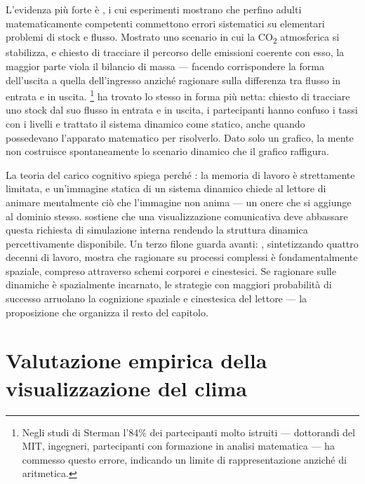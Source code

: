 L'evidenza più forte è \citet{sterman2008}, i cui esperimenti mostrano che perfino adulti matematicamente competenti commettono errori sistematici su elementari problemi di stock e flusso. Mostrato uno scenario in cui la CO\textsubscript{2} atmosferica si stabilizza, e chiesto di tracciare il percorso delle emissioni coerente con esso, la maggior parte viola il bilancio di massa --- facendo corrispondere la forma dell'uscita a quella dell'ingresso anziché ragionare sulla differenza tra flusso in entrata e in uscita.
\footnote{Negli studi di Sterman l'84\% dei partecipanti molto istruiti --- dottorandi del MIT, ingegneri, partecipanti con formazione in analisi matematica --- ha commesso questo errore, indicando un limite di rappresentazione anziché di aritmetica.} \citet{cronin2009} ha trovato lo stesso in forma più netta: chiesto di tracciare uno stock dal suo flusso in entrata e in uscita, i partecipanti hanno confuso i tassi con i livelli e trattato il sistema dinamico come statico, anche quando possedevano l'apparato matematico per risolverlo. Dato solo un grafico, la mente non costruisce spontaneamente lo scenario dinamico che il grafico raffigura.



La teoria del carico cognitivo spiega perché \citep{sweller1988, swellervanmerrienboer2019}: la memoria di lavoro è strettamente limitata, e un'immagine statica di un sistema dinamico chiede al lettore di animare mentalmente ciò che l'immagine non anima --- un onere che si aggiunge al dominio stesso. \citet{ware2021} sostiene che una visualizzazione comunicativa deve abbassare questa richiesta di simulazione interna rendendo la struttura dinamica percettivamente disponibile. Un terzo filone guarda avanti: \citet{tversky2019}, sintetizzando quattro decenni di lavoro, mostra che ragionare su processi complessi è fondamentalmente spaziale, compreso attraverso schemi corporei e cinestesici. Se ragionare sulle dinamiche è spazialmente incarnato, le strategie con maggiori probabilità di successo arruolano la cognizione spaziale e cinestesica del lettore --- la proposizione che organizza il resto del capitolo.

\section{Valutazione empirica della visualizzazione del clima}
\label{sec:empirical-viz}

